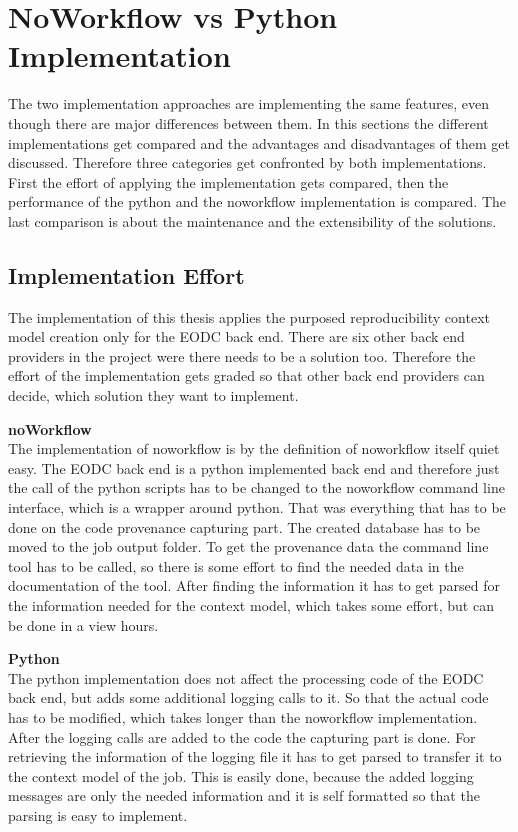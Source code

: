 \documentclass[draft,final]{vutinfth} %
\begin{document}
\section{NoWorkflow vs Python Implementation}\label{Evaluation:NvsP}
The two implementation approaches are implementing the same features, even though there are major differences between them. In this sections the different implementations get compared and the advantages and disadvantages of them get discussed. Therefore three categories get confronted by both implementations. First the effort of applying the implementation gets compared, then the performance of the python and the noworkflow implementation is compared. The last comparison is about the maintenance and the extensibility of the solutions. 

\subsection{Implementation Effort}\label{NvsP:Implementation Effort}
The implementation of this thesis applies the purposed reproducibility context model creation only for the EODC back end. There are six other back end providers in the project were there needs to be a solution too. Therefore the effort of the implementation gets graded so that other back end providers can decide, which solution they want to implement.

\textbf{noWorkflow} \\
The implementation of noworkflow is by the definition of noworkflow itself quiet easy. The EODC back end is a python implemented back end and therefore just the call of the python scripts has to be changed to the noworkflow command line interface, which is a wrapper around python. That was everything that has to be done on the code provenance capturing part. The created database has to be moved to the job output folder. To get the provenance data the command line tool has to be called, so there is some effort to find the needed data in the documentation of the tool. After finding the information it has to get parsed for the information needed for the context model, which takes some effort, but can be done in a view hours. 

\textbf{Python} \\
The python implementation does not affect the processing code of the EODC back end, but adds some additional logging calls to it. So that the actual code has to be modified, which takes longer than the noworkflow implementation. After the logging calls are added to the code the capturing part is done. For retrieving the information of the logging file it has to get parsed to transfer it to the context model of the job. This is easily done, because the added logging messages are only the needed information and it is self formatted so that the parsing is easy to implement.   
\end{document}
